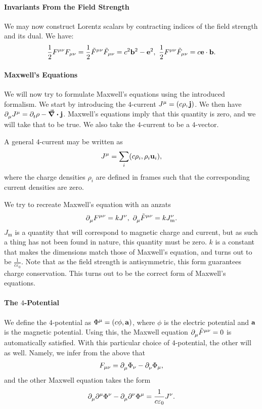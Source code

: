 \paragraph{Invariants From the Field Strength}
We may now construct Lorentz scalars by contracting indices of the field strength and its dual. We have:
\begin{align*}
	\frac{1}{2}F^{\mu\nu}F_{\mu\nu} = \frac{1}{2}\tilde{F}^{\mu\nu}\tilde{F}_{\mu\nu} = c^{2}\vb{b}^{2} - \vb{e}^{2},\ \frac{1}{2}F^{\mu\nu}\tilde{F}_{\mu\nu} = c\vb{e}\cdot\vb{b}.
\end{align*}

\paragraph{Maxwell's Equations}
We will now try to formulate Maxwell's equations using the introduced formalism. We start by introducing the $4$-current $J^{\mu} = (c\rho, \vb{j})$. We then have $\del{\mu}{J^{\mu}} = \del{t}{\rho} - \div{\vb{j}}$. Maxwell's equations imply that this quantity is zero, and we will take that to be true. We also take the $4$-current to be a $4$-vector.

A general $4$-current may be written as
\begin{align*}
	J^{\mu} = \sum\limits_{i}(c\rho_{i}, \rho_{i}\vb{u}_{i}),
\end{align*}
where the charge densities $\rho_{i}$ are defined in frames such that the corresponding current densities are zero.

We try to recreate Maxwell's equation with an anzats
\begin{align*}
	\del{\mu}{F^{\mu\nu}} = kJ^{\nu},\ \del{\mu}{\tilde{F}^{\mu\nu}} = kJ_{\text{m}}^{\nu}.
\end{align*}
$J_{\text{m}}$ is a quantity that will correspond to magnetic charge and current, but as such a thing has not been found in nature, this quantity must be zero. $k$ is a constant that makes the dimensions match those of Maxwell's equation, and turns out to be $\frac{1}{c\varepsilon_{0}}$. Note that as the field strength is antisymmetric, this form guarantees charge conservation. This turns out to be the correct form of Maxwell's equations.

\paragraph{The $4$-Potential}
We define the $4$-potential as $\Phi^{\mu} = (c\phi, \vb{a})$, where $\phi$ is the electric potential and $\vb{a}$ is the magnetic potential. Using this, the Maxwell equation $\del{\mu}{\tilde{F}^{\mu\nu}} = 0$ is automatically satisfied. With this particular choice of $4$-potential, the other will as well. Namely, we infer from the above that 
\begin{align*}
	F_{\mu\nu} = \del{\mu}{\Phi_{\nu}} - \del{\nu}{\Phi_{\mu}},
\end{align*}
and the other Maxwell equation takes the form
\begin{align*}
	\del{\mu}{\del[\mu]{}{\Phi^{\nu}}} - \del{\mu}{\del[\nu]{}{\Phi^{\mu}}} = \frac{1}{c\varepsilon_{0}}J^{\nu}.
\end{align*}

